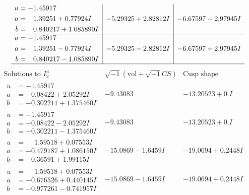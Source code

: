 \documentclass[1p]{elsarticle_modified}
\theoremstyle{definition}
\newcommand{\I}{\sqrt{-1}}
\begin{document}
$$\begin{array}{c|c|c}
\begin{aligned}
u &= -1.45917\phantom{ +0.000000I} \\
a &= \phantom{-}1.39251 + 0.77924 I \\
b &= \phantom{-}0.840217 + 1.085890 I\end{aligned}
 & -5.29325 + 2.82812 I & -6.67597 - 2.97945 I \\ \hline\begin{aligned}
u &= -1.45917\phantom{ +0.000000I} \\
a &= \phantom{-}1.39251 - 0.77924 I \\
b &= \phantom{-}0.840217 - 1.085890 I\end{aligned}
 & -5.29325 - 2.82812 I & -6.67597 + 2.97945 I\\
 \hline 
 \end{array}$$\newpage$$\begin{array}{c|c|c}  
\text{Solutions to }I^u_{2}& \I (\text{vol} + \sqrt{-1}CS) & \text{Cusp shape}\\
 \hline 
\begin{aligned}
u &= -1.45917\phantom{ +0.000000I} \\
a &= -0.08422 + 2.05292 I \\
b &= -0.302211 + 1.375460 I\end{aligned}
 & -9.43083\phantom{ +0.000000I} & -13.20523 + 0. I\phantom{ +0.000000I} \\ \hline\begin{aligned}
u &= -1.45917\phantom{ +0.000000I} \\
a &= -0.08422 - 2.05292 I \\
b &= -0.302211 - 1.375460 I\end{aligned}
 & -9.43083\phantom{ +0.000000I} & -13.20523 + 0. I\phantom{ +0.000000I} \\ \hline\begin{aligned}
u &= \phantom{-}1.59518 + 0.07553 I \\
a &= -0.479187 + 1.086150 I \\
b &= -0.36591 + 1.99115 I\end{aligned}
 & -15.0869 - 1.6459 I & -19.0694 + 0.2448 I \\ \hline\begin{aligned}
u &= \phantom{-}1.59518 + 0.07553 I \\
a &= -0.676526 + 0.440145 I \\
b &= -0.977261 - 0.741957 I\end{aligned}
 & -15.0869 - 1.6459 I & -19.0694 + 0.2448 I \\ \hline\begin{aligned}

\end{aligned}
\end{array}$$
\end{document}
